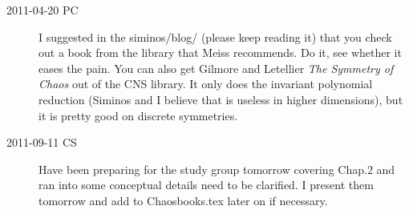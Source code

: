 \begin{description}
\item[2011-04-20 PC] I suggested in the siminos/blog/ (please keep reading it)
that you check out a book from the library that Meiss recommends. Do it, see
whether it eases the pain. You can also get
Gilmore and Letellier
{\em The Symmetry of Chaos} out of the CNS library. It only does the
invariant polynomial reduction (Siminos and I believe that is useless in
higher dimensions), but it is pretty good on discrete symmetries.

\item[2011-09-11 CS]
Have been preparing for the study group tomorrow covering Chap.2 and ran into some conceptual details need to be clarified. I present them tomorrow and add to Chaosbooks.tex later on if necessary.



\end{description}
